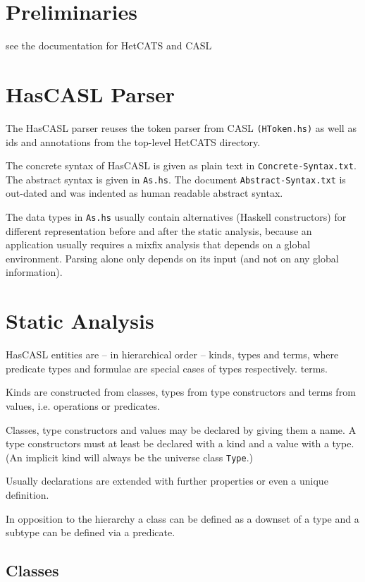 \documentclass{article}
\begin{document}
\section{Preliminaries}

see the documentation for HetCATS and CASL

\section{HasCASL Parser}
The HasCASL parser reuses the token parser from CASL \texttt{(HToken.hs)} as
well as ids and annotations from the top-level HetCATS directory.

The concrete syntax of HasCASL is given as plain text in
\texttt{Concrete-Syntax.txt}. The abstract syntax is given in
\texttt{As.hs}. The document \texttt{Abstract-Syntax.txt} is out-dated and was
indented as human readable abstract syntax.

The data types in \texttt{As.hs} usually contain alternatives (Haskell
constructors) for different representation before and after the static
analysis, because an application usually requires a mixfix analysis that
depends on a global environment. Parsing alone only depends on its input
(and not on any global information).

\section{Static Analysis}

HasCASL entities are -- in hierarchical
order -- kinds, types and terms, where predicate types and formulae are
special cases of types respectively. terms.

Kinds are constructed from classes, types from type
constructors and terms from values, i.e. operations or predicates.

Classes, type constructors and values may be declared by giving them a name.
A type constructors must at least be declared with a kind and a value with a
type. (An implicit kind will always be the universe class \texttt{Type}.)

Usually declarations are extended with further properties or even a unique
definition.

In opposition to the hierarchy a class can be defined as a downset of a type
and a subtype can be defined via a predicate.

\subsection{Classes}
\end{document}
